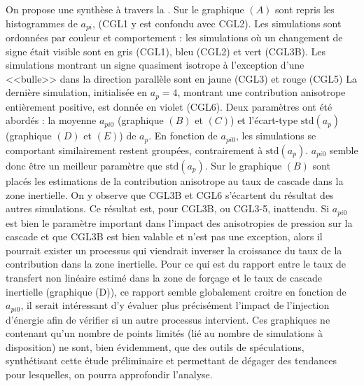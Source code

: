 On propose une synthèse à travers la . Sur le graphique $(A)$ sont repris les histogrammes de $a_{pi}$, (CGL1 y est confondu avec CGL2). Les simulations sont ordonnées par couleur et comportement : les simulations où un changement de signe était visible sont en gris (CGL1), bleu (CGL2) et vert (CGL3B). Les simulations  montrant un signe quasiment isotrope à l'exception d'une <<bulle>> dans la direction parallèle sont en jaune (CGL3) et rouge (CGL5) La dernière simulation, initialisée en $a_p  = 4$, montrant une contribution anisotrope entièrement positive, est donnée en violet (CGL6). Deux paramètres ont été abordés :  la moyenne $a_{pi0}$ (graphique $(B)$ et $(C)$) et l'écart-type $\text{std}(a_p)$  (graphique $(D)$ et $(E)$) de $a_p$. En fonction de $a_{pi0}$, les simulations se comportant similairement restent groupées, contrairement à $\text{std}(a_p)$.  $a_{pi0}$ semble donc être un meilleur paramètre  que $\text{std}(a_p)$. Sur le graphique $(B)$ sont placés les estimations de la contribution anisotrope au taux de cascade dans la zone inertielle. On y observe que CGL3B et CGL6 s'écartent du résultat des autres simulations. Ce résultat est, pour CGL3B, ou CGL3-5, inattendu. Si $a_{pi0}$ est bien le paramètre important dans l'impact des anisotropies de pression sur la cascade et que CGL3B est bien valable et n'est pas une exception, alors il pourrait exister un processus qui viendrait inverser la croissance du taux de la contribution dans la zone inertielle. Pour ce qui est du rapport entre le taux de transfert non linéaire estimé dans la zone de forçage et le taux de cascade inertielle (graphique (D)), ce rapport semble globalement croitre en fonction de $a_{pi0}$, il serait intéressant d'y évaluer plus précisément l'impact de l'injection d'énergie afin de vérifier si un autre processus intervient. Ces graphiques ne contenant qu'un nombre de points limités (lié au nombre de simulations à disposition) ne sont, bien évidemment, que des outils de spéculations, synthétisant cette étude préliminaire et permettant de dégager des tendances pour lesquelles, on pourra approfondir l'analyse.





